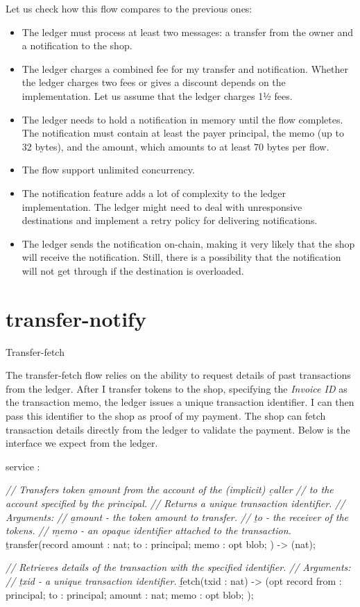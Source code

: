 \documentclass{article}
\begin{document}
Let us check how this flow compares to the previous ones:
\begin{itemize}
  \item The ledger must process at least two messages: a transfer from the owner and a notification to the shop.
  \item
    The ledger charges a combined fee for my transfer and notification.
    Whether the ledger charges two fees or gives a discount depends on the implementation.
    Let us assume that the ledger charges 1½ fees.
  \item
    The ledger needs to hold a notification in memory until the flow completes.
    The notification must contain at least the payer principal, the memo (up to 32 bytes), and the amount, which amounts to at least 70 bytes per flow.
  \item The flow support unlimited concurrency.
  \item
    The notification feature adds a lot of complexity to the ledger implementation.
    The ledger might need to deal with unresponsive destinations and implement a retry policy for delivering notifications.
  \item
    The ledger sends the notification on-chain, making it very likely that the shop will receive the notification.
    Still, there is a possibility that the notification will not get through if the destination is overloaded.
\end{itemize}

\section{transfer-notify}{Transfer-fetch}

The transfer-fetch flow relies on the ability to request details of past transactions from the ledger.
After I transfer tokens to the shop, specifying the \emph{Invoice ID} as the transaction memo, the ledger issues a unique transaction identifier.
I can then pass this identifier to the shop as proof of my payment.
The shop can fetch transaction details directly from the ledger to validate the payment.
Below is the interface we expect from the ledger.

\begin{code}[candid]
service : {
  \emph{// Transfers token \b{amount} from the account of the (implicit) \b{caller}}
  \emph{// to the account specified by the principal.}
  \emph{// Returns a unique transaction identifier.}
  \emph{// Arguments:}
  \emph{//   \b{amount} - the token amount to transfer.}
  \emph{//   \b{to} - the receiver of the tokens.}
  \emph{//   \b{memo} - an opaque identifier attached to the transaction.}
  \b{transfer}(record {
    amount : nat;
    to : principal;
    memo : opt blob;
  }) -> (nat);

  \emph{// Retrieves details of the transaction with the specified identifier.}
  \emph{// Arguments:}
  \emph{//   \b{txid} - a unique transaction identifier.}
  \b{fetch}(txid : nat) -> (opt record {
    from : principal;
    to : principal;
    amount : nat;
    memo : opt blob;
  });
}
\end{code}
\end{document}
